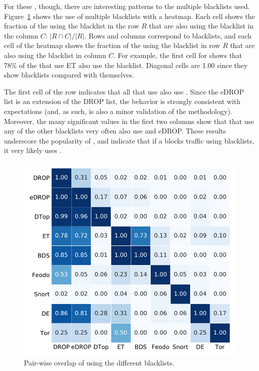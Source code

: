 For these {}, though, there are interesting patterns to the
multiple blacklists used.  Figure~\ref{fig:perfect-heatmap} shows the
use of multiple blacklists with a heatmap.  Each cell shows the fraction of the {} using the blacklist in the
   row $R$ that are also using the blacklist in the column $C$: $|R \cap C| / |R|$. Rows and columns
correspond to blacklists, and each cell of the heatmap shows the
fraction of the {} using the blacklist in row $R$ that are
also using the blacklist in column $C$.  For example, the first cell
for {\etcompromised} shows that 78\% of the {} that use ET
also use the {\spamhausdrop} blacklist.  Diagonal cells are 1.00 since
they show blacklists compared with themselves.

The first cell of the {\spamhausedrop} row indicates that all
{} that use {\spamhausedrop} also use {\spamhausdrop}.
Since the eDROP list is an extension of the DROP list, the behavior is
strongly consistent with expectations (and, as such, is also a minor
validation of the methodology).  Moreover, the many significant values
in the first two columns show that {} that use any of the
other blacklists very often also use {\spamhausdrop} and eDROP.  These
results underscore the popularity of {\spamhausdrop}, and indicate
that if a {} blocks traffic using blacklists, it very likely
uses {\spamhausdrop}.

\begin{figure}[t]
  \centering
  \includegraphics[width=0.85\linewidth]{data_usage/images/perfect_blocking_heatmap.pdf}
  \caption{Pair-wise overlap of {} using the different blacklists.}
  \label{fig:perfect-heatmap}
\end{figure}
